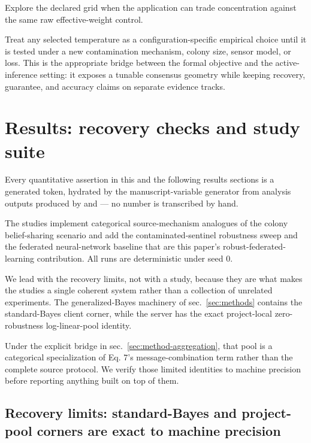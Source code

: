 \documentclass[
  english,
]{article}
\theoremstyle{plain}
\theoremstyle{definition}
\theoremstyle{remark}
\theoremstyle{definition}
\begin{document}
Explore the declared grid when the application can trade concentration
against the same raw effective-weight control.

Treat any selected temperature as a configuration-specific empirical
choice until it is tested under a new contamination mechanism, colony
size, sensor model, or loss. This is the appropriate bridge between the
formal objective and the active-inference setting: it exposes a tunable
consensus geometry while keeping recovery, guarantee, and accuracy
claims on separate evidence tracks.

\section{Results: recovery checks and study suite}\label{sec:results}

Every quantitative assertion in this and the following results sections
is a generated token, hydrated by the manuscript-variable generator from
analysis outputs produced by  and
 --- no number is transcribed by
hand.

The studies implement categorical source-mechanism analogues of the
colony belief-sharing scenario \citep{friston2024federated} and add the
contaminated-sentinel robustness sweep and the federated neural-network
baseline that are this paper's robust-federated-learning contribution.
All runs are deterministic under seed 0.

We lead with the recovery limits, not with a study, because they are
what makes the studies a single coherent system rather than a collection
of unrelated experiments. The generalized-Bayes machinery of
sec.~\ref{sec:methods} contains the standard-Bayes client corner, while
the server has the exact project-local zero-robustness log-linear-pool
identity.

Under the explicit bridge in sec.~\ref{sec:method-aggregation}, that
pool is a categorical specialization of Eq. 7's message-combination term
rather than the complete source protocol. We verify those limited
identities to machine precision before reporting anything built on top
of them.

\subsection{Recovery limits: standard-Bayes and project-pool corners are
exact to machine precision}\label{sec:results-recovery}
\end{document}
